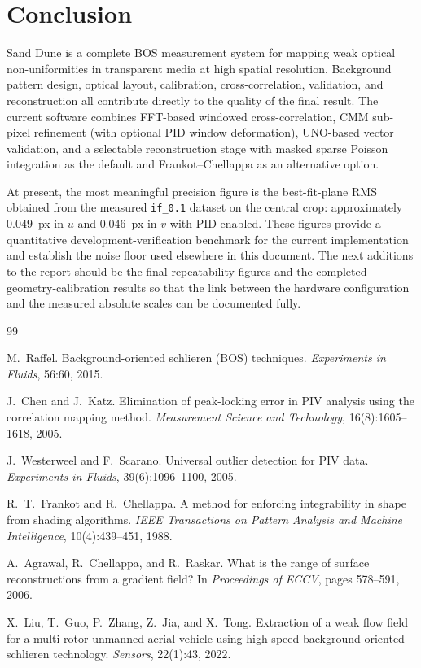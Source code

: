 \documentclass[11pt]{article}
\begin{document}
\section{Conclusion}

Sand Dune is a complete BOS measurement system for mapping weak optical
non-uniformities in transparent media at high spatial resolution.
Background pattern design, optical layout, calibration, cross-correlation,
validation, and reconstruction all contribute directly to the quality of the
final result. The current software combines FFT-based
windowed cross-correlation, CMM sub-pixel refinement (with optional PID
window deformation), UNO-based vector validation, and a selectable
reconstruction stage with masked sparse Poisson integration as the default
and Frankot--Chellappa as an alternative option.

At present, the most meaningful precision figure is the best-fit-plane RMS
obtained from the measured \texttt{if\_0.1} dataset on the central crop:
approximately $0.049$~px in $u$ and $0.046$~px in $v$ with PID enabled.
These figures provide a quantitative development-verification benchmark for
the current implementation and establish the noise floor used elsewhere in
this document. The next additions to the report should be the final
repeatability figures and the completed geometry-calibration results so
that the link between the hardware configuration and the measured absolute
scales can be documented fully.

\begin{thebibliography}{99}

M.~Raffel.
\newblock Background-oriented schlieren (BOS) techniques.
\newblock \emph{Experiments in Fluids}, 56:60, 2015.

J.~Chen and J.~Katz.
\newblock Elimination of peak-locking error in PIV analysis using the
  correlation mapping method.
\newblock \emph{Measurement Science and Technology}, 16(8):1605--1618, 2005.

J.~Westerweel and F.~Scarano.
\newblock Universal outlier detection for PIV data.
\newblock \emph{Experiments in Fluids}, 39(6):1096--1100, 2005.

R.~T.~Frankot and R.~Chellappa.
\newblock A method for enforcing integrability in shape from shading algorithms.
\newblock \emph{IEEE Transactions on Pattern Analysis and Machine Intelligence},
  10(4):439--451, 1988.

A.~Agrawal, R.~Chellappa, and R.~Raskar.
\newblock What is the range of surface reconstructions from a gradient field?
\newblock In \emph{Proceedings of ECCV}, pages 578--591, 2006.

X.~Liu, T.~Guo, P.~Zhang, Z.~Jia, and X.~Tong.
\newblock Extraction of a weak flow field for a multi-rotor unmanned aerial
  vehicle using high-speed background-oriented schlieren technology.
\newblock \emph{Sensors}, 22(1):43, 2022.

\end{thebibliography}
\end{document}
